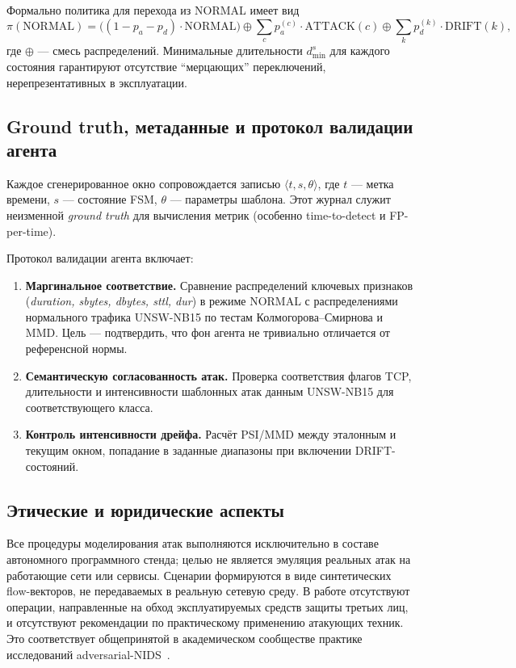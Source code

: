 Формально политика для перехода из NORMAL имеет вид
\[
\pi(\text{NORMAL}) =
\bigl((1-p_a-p_d)\!\cdot\!\text{NORMAL}\bigr)
\oplus \sum_{c}\!p_a^{(c)}\!\cdot\!\text{ATTACK}(c)
\oplus \sum_{k}\!p_d^{(k)}\!\cdot\!\text{DRIFT}(k),
\]
где \(\oplus\) --- смесь распределений. Минимальные длительности
\(d_{\min}^{s}\) для каждого состояния гарантируют отсутствие
``мерцающих'' переключений, нерепрезентативных в эксплуатации.

\subsection{Ground truth, метаданные и протокол валидации агента}

Каждое сгенерированное окно сопровождается записью \(\langle t, s, \theta\rangle\),
где \(t\) --- метка времени, \(s\) --- состояние FSM, \(\theta\) ---
параметры шаблона. Этот журнал служит неизменной \emph{ground truth} для
вычисления метрик (особенно time-to-detect и FP-per-time).

Протокол валидации агента включает:
\begin{enumerate}
    \item \textbf{Маргинальное соответствие.} Сравнение распределений ключевых
    признаков (\emph{duration, sbytes, dbytes, sttl, dur}) в режиме NORMAL
    с распределениями нормального трафика UNSW-NB15 по тестам
    Колмогорова--Смирнова и MMD. Цель --- подтвердить, что фон агента не
    тривиально отличается от референсной нормы.
    \item \textbf{Семантическую согласованность атак.} Проверка соответствия
    флагов TCP, длительности и интенсивности шаблонных атак данным UNSW-NB15
    для соответствующего класса.
    \item \textbf{Контроль интенсивности дрейфа.} Расчёт PSI/MMD между
    эталонным и текущим окном, попадание в заданные диапазоны при
    включении DRIFT-состояний.
\end{enumerate}

\subsection{Этические и юридические аспекты}

Все процедуры моделирования атак выполняются исключительно в составе
автономного программного стенда; целью не является эмуляция реальных атак
на работающие сети или сервисы. Сценарии формируются в виде синтетических
flow-векторов, не передаваемых в реальную сетевую среду. В работе
отсутствуют операции, направленные на обход эксплуатируемых средств защиты
третьих лиц, и отсутствуют рекомендации по практическому применению
атакующих техник. Это соответствует общепринятой в академическом сообществе
практике исследований adversarial-NIDS~\cite{apruzzese2020adversarial,
ring2019flowgan}.

